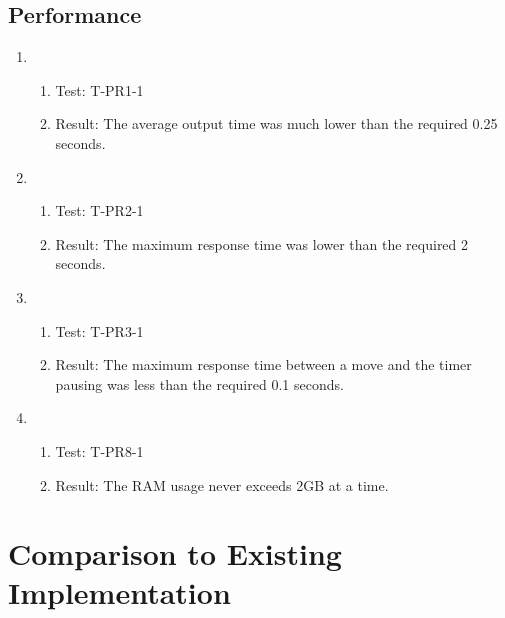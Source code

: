 \documentclass[12pt, titlepage]{article}
\begin{document}
    \subsection{Performance}
        \begin{enumerate}
                \item 
                    \begin{enumerate}[ ]
                        \item Test: T-PR1-1
                        \item Result: The average output time was much lower than the required 0.25 seconds.
                    \end{enumerate}
                    
                \item 
                    \begin{enumerate}[ ]
                        \item Test: T-PR2-1
                        \item Result: The maximum response time was lower than the required 2 seconds.
                    \end{enumerate}
                
                \item 
                    \begin{enumerate}[ ]
                        \item Test: T-PR3-1
                        \item Result: The maximum response time between a move and the timer pausing was less than the required 0.1 seconds.
                    \end{enumerate}
                    
                \item 
                    \begin{enumerate}[ ]
                        \item Test: T-PR8-1
                        \item Result: The RAM usage never exceeds 2GB at a time.
                    \end{enumerate}
        \end{enumerate}
	
\section{Comparison to Existing Implementation}	
\end{document}
